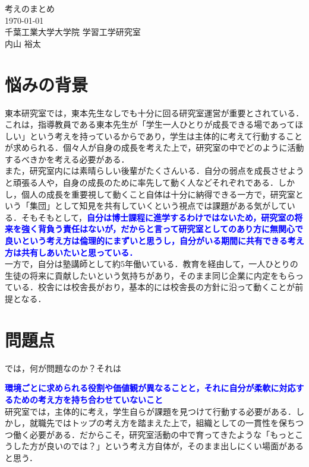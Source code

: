\documentclass[a4paper,12pt]{ltjsarticle}
\newcommand{\important}[1]{\textcolor{blue}{\textbf{#1}}}
\begin{document}
\begin{center}
  {\huge 考えのまとめ}\\[1em]
  {\large \today}\\
  {\large 千葉工業大学大学院 学習工学研究室}\\
  {\large 内山 裕太}
\end{center}

\section{悩みの背景}

東本研究室では，東本先生なしでも十分に回る研究室運営が重要とされている．これは，指導教員である東本先生が「学生一人ひとりが成長できる場であってほしい」という考えを持っているからであり，学生は主体的に考えて行動することが求められる．個々人が自身の成長を考えた上で，研究室の中でどのように活動するべきかを考える必要がある．\\

また，研究室内には素晴らしい後輩がたくさんいる．自分の弱点を成長させようと頑張る人や，自身の成長のために率先して動く人などそれぞれである．しかし，個人の成長を重要視して動くこと自体は十分に納得できる一方で，研究室という「集団」として知見を共有していくという視点では課題がある気がしている．そもそもとして，\important{自分は博士課程に進学するわけではないため，研究室の将来を強く背負う責任はないが，だからと言って研究室としてのあり方に無関心で良いという考え方は倫理的にまずいと思うし，自分がいる期間に共有できる考え方は共有しあいたいと思っている．}\\

一方で，自分は塾講師として約5年働いている．教育を経由して，一人ひとりの生徒の将来に貢献したいという気持ちがあり，そのまま同じ企業に内定をもらっている．校舎には校舎長がおり，基本的には校舎長の方針に沿って動くことが前提となる．
\newpage

\section{問題点}

では，何が問題なのか？それは

\important{環境ごとに求められる役割や価値観が異なることと，それに自分が柔軟に対応するための考え方を持ち合わせていないこと}\\

研究室では，主体的に考え，学生自らが課題を見つけて行動する必要がある．しかし，就職先ではトップの考え方を踏まえた上で，組織としての一貫性を保ちつつ働く必要がある．だからこそ，研究室活動の中で育ってきたような「もっとこうした方が良いのでは？」という考え方自体が，そのまま出しにくい場面があると思う．\\
\end{document}
